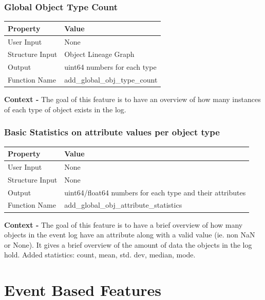\documentclass{article}
\begin{document}
\subsubsection{Global Object Type Count}
\begin{center}
	\begin{tabular}{| p{3cm} p{7cm} |}
		\hline
		\textbf{Property} & \textbf{Value}\\
		\hline
		User Input & None\\
		Structure Input & Object Lineage Graph\\
		Output & uint64 numbers for each type\\
		Function Name & add\_global\_obj\_type\_count\\
		\hline
	\end{tabular}
\end{center}

\textbf{Context -} The goal of this feature is to have an overview of how many instances of each type of object exists in the log.\\

\subsubsection{Basic Statistics on attribute values per object type}
\begin{center}
	\begin{tabular}{| p{3cm} p{7cm} |}
		\hline
		\textbf{Property} & \textbf{Value}\\
		\hline
		User Input & None\\
		Structure Input & None\\
		Output & uint64/float64 numbers for each type and their attributes\\
		Function Name & add\_global\_obj\_attribute\_statistics\\
		\hline
	\end{tabular}
\end{center}

\textbf{Context -} The goal of this feature is to have a brief overview of how many objects in the event log have an attribute along with a valid value (ie. non NaN or None). It gives a brief overview of the amount of data the objects in the log hold. Added statistics: count, mean, std. dev, median, mode.\\

\section{Event Based Features}
\end{document}
